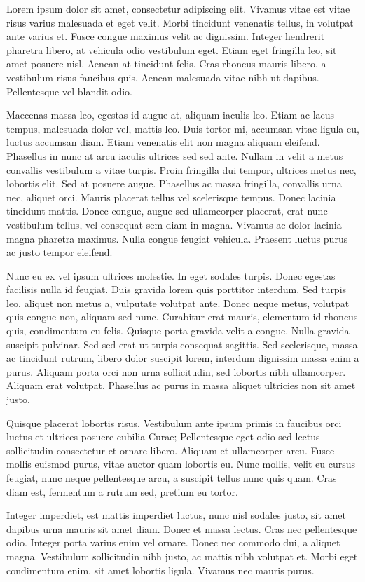 \begin{tueABSTRACT}
Lorem ipsum dolor sit amet, consectetur adipiscing elit. Vivamus vitae est vitae risus varius malesuada et eget velit. Morbi tincidunt venenatis tellus, in volutpat ante varius et. Fusce congue maximus velit ac dignissim. Integer hendrerit pharetra libero, at vehicula odio vestibulum eget. Etiam eget fringilla leo, sit amet posuere nisl. Aenean at tincidunt felis. Cras rhoncus mauris libero, a vestibulum risus faucibus quis. Aenean malesuada vitae nibh ut dapibus. Pellentesque vel blandit odio.

Maecenas massa leo, egestas id augue at, aliquam iaculis leo. Etiam ac lacus tempus, malesuada dolor vel, mattis leo. Duis tortor mi, accumsan vitae ligula eu, luctus accumsan diam. Etiam venenatis elit non magna aliquam eleifend. Phasellus in nunc at arcu iaculis ultrices sed sed ante. Nullam in velit a metus convallis vestibulum a vitae turpis. Proin fringilla dui tempor, ultrices metus nec, lobortis elit. Sed at posuere augue. Phasellus ac massa fringilla, convallis urna nec, aliquet orci. Mauris placerat tellus vel scelerisque tempus. Donec lacinia tincidunt mattis. Donec congue, augue sed ullamcorper placerat, erat nunc vestibulum tellus, vel consequat sem diam in magna. Vivamus ac dolor lacinia magna pharetra maximus. Nulla congue feugiat vehicula. Praesent luctus purus ac justo tempor eleifend.

Nunc eu ex vel ipsum ultrices molestie. In eget sodales turpis. Donec egestas facilisis nulla id feugiat. Duis gravida lorem quis porttitor interdum. Sed turpis leo, aliquet non metus a, vulputate volutpat ante. Donec neque metus, volutpat quis congue non, aliquam sed nunc. Curabitur erat mauris, elementum id rhoncus quis, condimentum eu felis. Quisque porta gravida velit a congue. Nulla gravida suscipit pulvinar. Sed sed erat ut turpis consequat sagittis. Sed scelerisque, massa ac tincidunt rutrum, libero dolor suscipit lorem, interdum dignissim massa enim a purus. Aliquam porta orci non urna sollicitudin, sed lobortis nibh ullamcorper. Aliquam erat volutpat. Phasellus ac purus in massa aliquet ultricies non sit amet justo.

Quisque placerat lobortis risus. Vestibulum ante ipsum primis in faucibus orci luctus et ultrices posuere cubilia Curae; Pellentesque eget odio sed lectus sollicitudin consectetur et ornare libero. Aliquam et ullamcorper arcu. Fusce mollis euismod purus, vitae auctor quam lobortis eu. Nunc mollis, velit eu cursus feugiat, nunc neque pellentesque arcu, a suscipit tellus nunc quis quam. Cras diam est, fermentum a rutrum sed, pretium eu tortor.

Integer imperdiet, est mattis imperdiet luctus, nunc nisl sodales justo, sit amet dapibus urna mauris sit amet diam. Donec et massa lectus. Cras nec pellentesque odio. Integer porta varius enim vel ornare. Donec nec commodo dui, a aliquet magna. Vestibulum sollicitudin nibh justo, ac mattis nibh volutpat et. Morbi eget condimentum enim, sit amet lobortis ligula. Vivamus nec mauris purus.
\end{tueABSTRACT}
